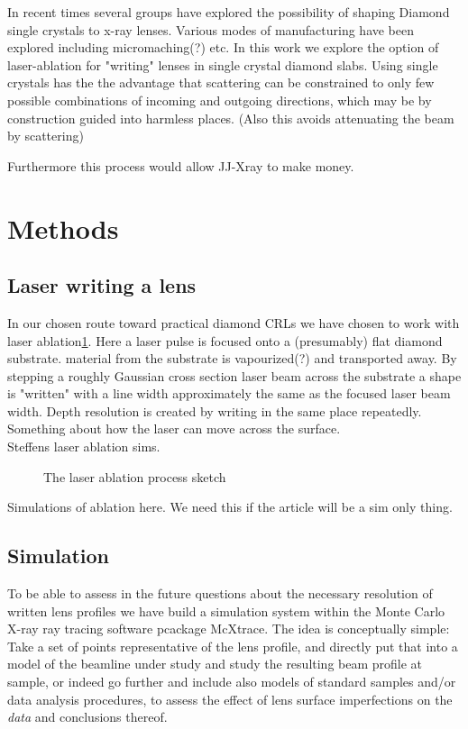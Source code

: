 \documentclass[preprint]{iucr}              %
\begin{document}
In recent times several groups\cite{otherDiamondLensPeople} have explored the possibility of shaping Diamond single crystals to x-ray lenses. Various modes of manufacturing have been explored including micromaching(?)\cite{waysToMakeDiamondLens} etc. In this work we explore the option of laser-ablation for "writing" lenses in single crystal diamond slabs. Using single crystals has the the advantage that scattering can be constrained to only few possible combinations of incoming and outgoing directions, which may be by construction guided into harmless places. (Also this avoids attenuating the beam by scattering)

Furthermore this process would allow JJ-Xray to make money.

\section{Methods}

\subsection{Laser writing  a lens}
In our chosen route toward practical diamond CRLs we have chosen to work with laser ablation\cref{fig:laser}. Here a laser pulse is focused onto a (presumably) flat diamond substrate. material from the substrate is vapourized(?) and transported away. By stepping a roughly Gaussian cross section laser beam across the substrate a shape is "written" with a line width approximately the same as the focused laser beam width. Depth resolution is created by writing in the same place repeatedly.\\
Something about how the laser can move across the surface.\\
Steffens laser ablation sims.\\
\begin{figure}
    \centering
    \caption{The laser ablation process sketch}
    \label{fig:laser}
\end{figure}

Simulations of ablation here.
We need this if the article will be a sim only thing.



\subsection{Simulation}
To be able to assess in the future questions about the necessary resolution of written lens profiles we have build a simulation system within the Monte Carlo X-ray ray tracing software pcackage McXtrace\cite{BergbackKnudsen2013}. The idea is conceptually simple: Take a set of points representative of the lens profile, and directly put that into a model of the beamline under study and study the resulting beam profile at sample, or indeed go further and include also models of standard samples and/or data analysis procedures, to assess the effect of lens surface imperfections on the \emph{data} and conclusions thereof.
\end{document}
